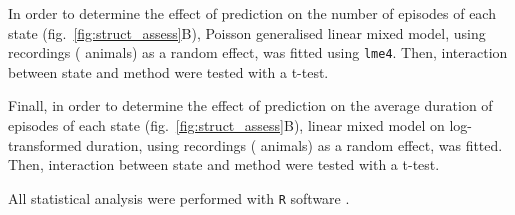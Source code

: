 In order to determine the effect of prediction on the number of episodes of each state (fig.~\ref{fig:struct_assess}B),
Poisson generalised linear mixed model, using recordings (\ie{} animals) as a
random effect, was fitted using \texttt{lme4}\cite{bates_lme4:_2014}.
Then, interaction between state and method were tested with a t-test.

Finall, in order to determine the effect of prediction on the average duration of episodes of each state (fig.~\ref{fig:struct_assess}B),
linear mixed model on log-transformed duration, using recordings (\ie{} animals) as a random effect, was fitted. 
Then, interaction between state and method were tested with a t-test.

All statistical analysis were performed with \texttt{R}
software \cite{r_core_team_r:_2014}.
